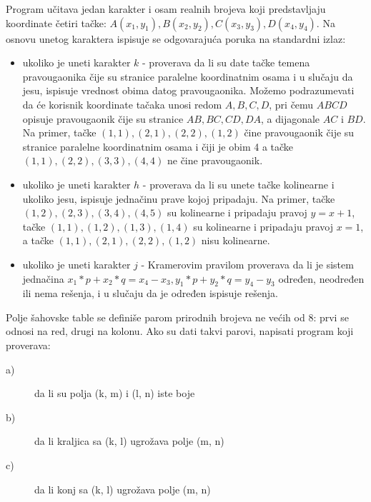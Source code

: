\begin{Exercise}[difficulty=1, label=v1.2_14] 
Program učitava jedan karakter i osam realnih brojeva koji predstavljaju 
koordinate četiri tačke: $A(x_1, y_1), B(x_2, y_2), C(x_3, y_3), D(x_4, y_4)$. Na osnovu unetog karaktera 
ispisuje se odgovarajuća poruka na standardni izlaz:
\begin{itemize}
\item ukoliko je uneti karakter $k$ - proverava da li su date tačke temena pravougaonika čije su stranice paralelne koordinatnim osama i 
    u slučaju da jesu, ispisuje vrednost obima datog pravougaonika. Možemo podrazumevati da će korisnik koordinate tačaka 
    unosi redom $A,B,C,D$, pri čemu $ABCD$ opisuje pravougaonik čije su stranice $AB,BC,CD,DA$, a dijagonale $AC$ i $BD$. 
    Na primer, tačke $(1,1),(2,1),(2,2),(1,2)$ čine pravougaonik čije su stranice paralelne koordinatnim osama i čiji je obim 4
    a tačke $(1,1),(2,2),(3,3),(4,4)$ ne čine pravougaonik. 
\item ukoliko je uneti karakter $h$ - proverava da li su unete tačke kolinearne i ukoliko jesu, ispisuje jednačinu prave kojoj pripadaju. 
    Na primer, tačke $(1,2),(2,3),(3,4),(4,5)$ su kolinearne i pripadaju pravoj $y=x+1$, 
    tačke $(1,1),(1,2),(1,3),(1,4)$ su kolinearne i pripadaju pravoj $x=1$,
    a tačke $(1,1),(2,1),(2,2),(1,2)$ nisu kolinearne.
\item ukoliko je uneti karakter $j$ - Kramerovim pravilom proverava da li je sistem jednačina
$x_1 * p + x_2 * q = x_4 - x_3,y_1 * p + y_2 * q = y_4 - y_3$
    određen, neodređen ili nema rešenja, i u slučaju da je određen ispisuje rešenja.
\end{itemize} 
\end{Exercise}
\ifresenja
 \begin{Answer}[ref=v1.2_14]
\end{Answer}
\fi


\begin{Exercise}[label=p1_21]
Polje šahovske table se definiše parom prirodnih brojeva ne većih od $8$: prvi se odnosi na red, drugi na kolonu. Ako su dati takvi
parovi, napisati program koji proverava: \\
\begin{description}
\item[a)] da li su polja (k, m) i (l, n) iste boje
\item[b)] da li kraljica sa (k, l) ugrožava polje (m, n)
\item[c)] da li konj sa (k, l) ugrožava polje (m, n)
\end{description}

\end{Exercise}




